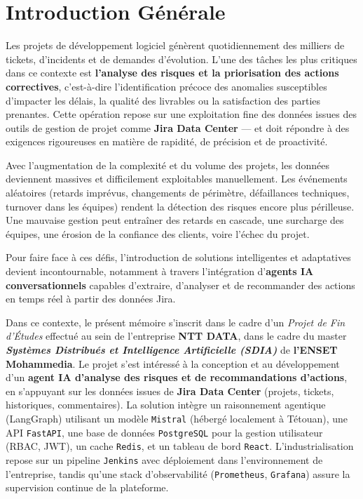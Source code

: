 \chapter*{Introduction Générale}

Les projets de développement logiciel génèrent quotidiennement des milliers de tickets, d’incidents et de demandes d’évolution. L’une des tâches les plus critiques dans ce contexte est \textbf{l’analyse des risques et la priorisation des actions correctives}, c’est-à-dire l’identification précoce des anomalies susceptibles d’impacter les délais, la qualité des livrables ou la satisfaction des parties prenantes. Cette opération repose sur une exploitation fine des données issues des outils de gestion de projet comme \textbf{Jira Data Center} — et doit répondre à des exigences rigoureuses en matière de rapidité, de précision et de proactivité.

\vspace{0.5em}

Avec l’augmentation de la complexité et du volume des projets, les données deviennent massives et difficilement exploitables manuellement. Les événements aléatoires (retards imprévus, changements de périmètre, défaillances techniques, turnover dans les équipes) rendent la détection des risques encore plus périlleuse. Une mauvaise gestion peut entraîner des retards en cascade, une surcharge des équipes, une érosion de la confiance des clients, voire l’échec du projet.

\vspace{0.5em}

Pour faire face à ces défis, l’introduction de solutions intelligentes et adaptatives devient incontournable, notamment à travers l’intégration d’\textbf{agents IA conversationnels} capables d’extraire, d’analyser et de recommander des actions en temps réel à partir des données Jira.

\vspace{0.5em}

Dans ce contexte, le présent mémoire s’inscrit dans le cadre d’un \textit{Projet de Fin d’Études} effectué au sein de l’entreprise \textbf{NTT DATA}, dans le cadre du master \textit{\textbf{Systèmes Distribués et Intelligence Artificielle (SDIA)}} de \textbf{l’ENSET Mohammedia}. Le projet s’est intéressé à la conception et au développement d’un \textbf{agent IA d’analyse des risques et de recommandations d’actions}, en s’appuyant sur les données issues de \textbf{Jira Data Center} (projets, tickets, historiques, commentaires). La solution intègre un raisonnement agentique (LangGraph) utilisant un modèle \texttt{Mistral} (hébergé localement à Tétouan), une API \texttt{FastAPI}, une base de données \texttt{PostgreSQL} pour la gestion utilisateur (RBAC, JWT), un cache \texttt{Redis}, et un tableau de bord \texttt{React}. L’industrialisation repose sur un pipeline \texttt{Jenkins} avec déploiement dans l’environnement de l’entreprise, tandis qu’une stack d’observabilité (\texttt{Prometheus}, \texttt{Grafana}) assure la supervision continue de la plateforme.

